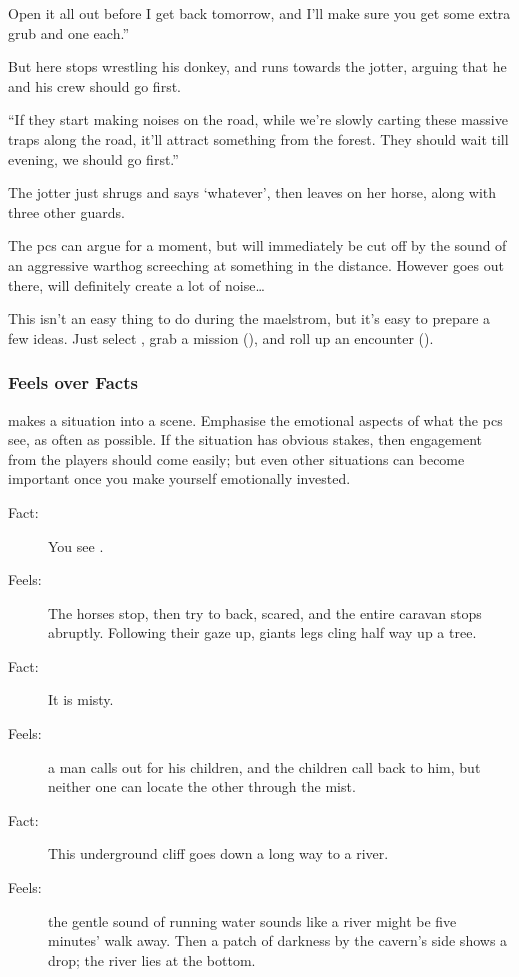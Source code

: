 \begin{multicols}{2}
\begin{boxtext}
  Open it all out before I get back tomorrow, and I'll make sure you get some extra grub and one  each.''

  But here  stops wrestling his donkey, and runs towards the \gls{jotter}, arguing that he and his crew should go first.

  ``If they start making noises on the road, while we're slowly carting these massive traps along the road, it'll attract something from the forest.
  They should wait till evening, we should go first.''

  The \gls{jotter} just shrugs and says `whatever', then leaves on her horse, along with three other \glspl{guard}.
\end{boxtext}

The \glspl{pc} can argue for a moment, but will immediately be cut off by the sound of an aggressive warthog screeching at something in the distance.
However goes out there, will definitely create a lot of noise\ldots

\bigLine

This isn't an easy thing to do during the maelstrom, but it's easy to prepare a few ideas.
Just select , grab a mission (), and roll up an encounter ().

\subsubsection{Feels over Facts}
makes a situation into a scene.
Emphasise the emotional aspects of what the \glspl{pc} see, as often as possible.
If the situation has obvious stakes, then engagement from the players should come easily; but even other situations can become important once you make yourself emotionally invested.

\begin{description}
  \item[Fact:] You see .
  \item[\quad Feels:] The horses stop, then try to back, scared, and the entire caravan stops abruptly.
  Following their gaze up, giants legs cling half way up a tree.
  \item[Fact:] It is misty.
  \item[\quad Feels:] a man calls out for his children, and the children call back to him, but neither one can locate the other through the mist.
  \item[Fact:] This underground cliff goes down a long way to a river.
  \item[\quad Feels:] the gentle sound of running water sounds like a river might be five minutes' walk away.
  Then a patch of darkness by the cavern's side shows a drop; the river lies at the bottom.
\end{description}


\end{multicols}
